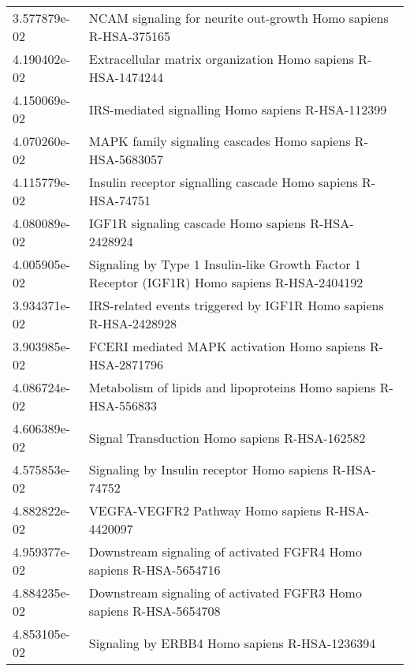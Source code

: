 \begin{longtable}{p{2.4cm}p{14.5cm}}
             3.577879e-02 &                               NCAM signaling for neurite out-growth Homo sapiens R-HSA-375165 \\
             4.190402e-02 &                                  Extracellular matrix organization Homo sapiens R-HSA-1474244 \\
             4.150069e-02 &                                             IRS-mediated signalling Homo sapiens R-HSA-112399 \\
             4.070260e-02 &                                     MAPK family signaling cascades Homo sapiens R-HSA-5683057 \\
             4.115779e-02 &                                  Insulin receptor signalling cascade Homo sapiens R-HSA-74751 \\
             4.080089e-02 &                                            IGF1R signaling cascade Homo sapiens R-HSA-2428924 \\
             4.005905e-02 &  Signaling by Type 1 Insulin-like Growth Factor 1 Receptor (IGF1R) Homo sapiens R-HSA-2404192 \\
             3.934371e-02 &                              IRS-related events triggered by IGF1R Homo sapiens R-HSA-2428928 \\
             3.903985e-02 &                                     FCERI mediated MAPK activation Homo sapiens R-HSA-2871796 \\
             4.086724e-02 &                               Metabolism of lipids and lipoproteins Homo sapiens R-HSA-556833 \\
             4.606389e-02 &                                                 Signal Transduction Homo sapiens R-HSA-162582 \\
             4.575853e-02 &                                        Signaling by Insulin receptor Homo sapiens R-HSA-74752 \\
             4.882822e-02 &                                               VEGFA-VEGFR2 Pathway Homo sapiens R-HSA-4420097 \\
             4.959377e-02 &                            Downstream signaling of activated FGFR4 Homo sapiens R-HSA-5654716 \\
             4.884235e-02 &                            Downstream signaling of activated FGFR3 Homo sapiens R-HSA-5654708 \\
             4.853105e-02 &                                                 Signaling by ERBB4 Homo sapiens R-HSA-1236394 \\

\end{longtable}

